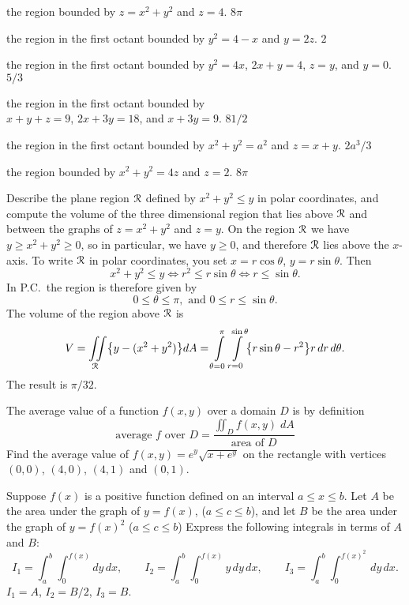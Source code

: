 \subprob the region bounded by $z=x^2+y^2$ and $z=4$. 
\answer
$8\pi$
\endanswer


\subprob the region in the first octant bounded by $y^2=4-x$ and $y=2z$.
\answer
$2$
\endanswer


\subprob the region in the first octant bounded by $y^2=4x$, $2x+y=4$, $z=y$,
and $y=0$.
\answer
$5/3$
\endanswer

\subprob the region in the first octant bounded by\\
$x+y+z=9$, $2x+3y=18$, and $x+3y=9$.
\answer
$81/2$
\endanswer

\subprob the region in the first octant bounded by $x^2+y^2=a^2$ and $z=x+y$.
\answer
$2a^3/3$
\endanswer

\subprob the region bounded by $x^2+y^2=4z$ and $z=2$. 
\answer
$8\pi$
\endanswer

\subprob Describe the plane region $\mathcal{R}$ defined by $x^2+y^2 \leq y$ in polar coordinates, and compute the volume of the three dimensional region that lies above $\mathcal{R}$ and between the graphs of $z=x^2+y^2$ and $z=y$.
\answer
On the region $\mathcal{R}$ we have $y\geq x^2+y^2 \geq0$, so in particular, we have $y\geq0$, and therefore  $\mathcal{R}$ lies above the $x$-axis.
To write $\mathcal{R}$ in polar coordinates, you set $x=r\cos\theta$, $y=r\sin\theta$.  Then
\[
x^2+y^2 \leq y \iff r^2 \leq r\sin\theta \iff r\leq \sin\theta.
\]
In P.C.~the region is therefore given by
\[
0\leq\theta\leq \pi, \text{ and }0\leq r\leq \sin\theta.
\]
The volume of the region above $\mathcal{R}$ is
\[
V = \iint\limits_{\mathcal{R}} \bigl\{y - (x^2+y^2)\bigr\} dA
=\int\limits_{\theta=0}^\pi \int\limits_{r=0}^{\sin\theta}
\bigl\{r\sin\theta - r^2\bigr\} r\, dr\, d\theta.
\]
The result is $\pi/32$.
\endanswer

\problem The average value of a function $f(x, y)$ over a domain $D$ is by definition
\[
\text{average $f$ over $D$}
=
\frac{\iint_D f(x, y) \;  dA}{\text{area of }D}
\]
Find the average value of $f(x,y)=e^y\sqrt{x+e^y}$ on the rectangle
with vertices $(0,0)$, $(4,0)$, $(4,1)$ and $(0,1)$.

\problem Suppose $f(x)$ is a positive function defined on an interval 
$a\le x\le b$.  
Let $A$ be the area under the graph of $y=f(x)$, ($a\le c\le b$), and
let $B$ be the area under the graph of $y=f(x)^2$ ($a\le c\le b$)
Express the following integrals in terms of $A$ and $B$:
\[
I_1 = \int_a^b \int_0^{f(x)} dy\, dx,
\qquad
I_2 = \int_a^b \int_0^{f(x)} y\,dy\, dx,
\qquad
I_3 = \int_a^b \int_0^{f(x)^2} \,dy\, dx.
\]
\answer
$I_1 = A$,
$I_2 = B/2$,
$I_3= B$.
\endanswer

